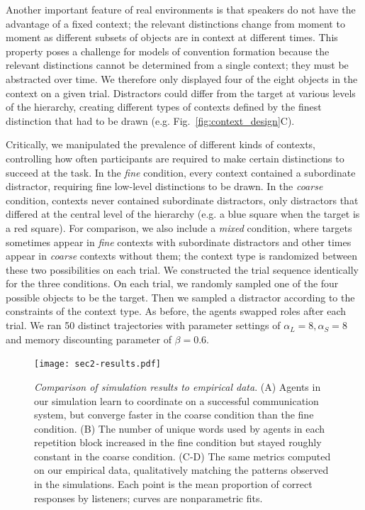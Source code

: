 Another important feature of real environments is that speakers do not have the advantage of a fixed context; the relevant distinctions change from moment to moment as different subsets of objects are in context at different times. 
This property poses a challenge for models of convention formation because the relevant distinctions cannot be determined from a single context; they must be abstracted over time.
We therefore only displayed four of the eight objects in the context on a given trial.
Distractors could differ from the target at various levels of the hierarchy, creating different types of contexts defined by the finest distinction that had to be drawn (e.g. Fig.~\ref{fig:context_design}C).  

Critically, we manipulated the prevalence of different kinds of contexts, controlling how often participants are required to make certain distinctions to succeed at the task. 
In the \emph{fine} condition, every context contained a subordinate distractor, requiring fine low-level distinctions to be drawn.
In the \emph{coarse} condition, contexts never contained subordinate distractors, only distractors that differed at the central level of the hierarchy (e.g. a blue square when the target is a red square).
For comparison, we also include a \emph{mixed} condition, where targets sometimes appear in \emph{fine} contexts with subordinate distractors and other times appear in \emph{coarse} contexts without them; the context type is randomized between these two possibilities on each trial.
We constructed the trial sequence identically for the three conditions. 
On each trial, we randomly sampled one of the four possible objects to be the target.
Then we sampled a distractor according to the constraints of the context type.
As before, the agents swapped roles after each trial. 
We ran 50 distinct trajectories with parameter settings of $\alpha_L=8, \alpha_S=8$ and memory discounting parameter of $\beta = 0.6$.


\begin{figure}[t]
\begin{center}
\texttt{[image: sec2-results.pdf]}
\caption{\emph{Comparison of simulation results to empirical data}. (A) Agents in our simulation learn to coordinate on a successful communication system, but converge faster in the coarse condition than the fine condition.  (B) The number of unique words used by agents in each repetition block increased in the fine condition but stayed roughly constant in the coarse condition. (C-D) The same metrics computed on our empirical data, qualitatively matching the patterns observed in the simulations. Each point is the mean proportion of correct responses by listeners; curves are nonparametric fits.}
\label{fig:sec2Results}
\end{center}
\end{figure}

